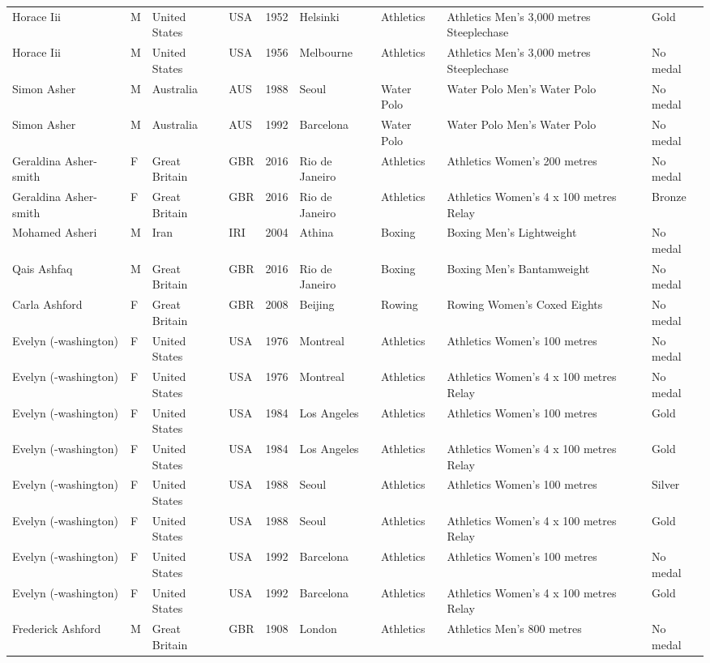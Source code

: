 \documentclass{article}%
\begin{document}
\begin{longtable}{l l l l l l l l l}
Horace Iii&M&United States&USA&1952&Helsinki&Athletics&Athletics Men's 3,000 metres Steeplechase&Gold\\%
Horace Iii&M&United States&USA&1956&Melbourne&Athletics&Athletics Men's 3,000 metres Steeplechase&No medal\\%
Simon Asher&M&Australia&AUS&1988&Seoul&Water Polo&Water Polo Men's Water Polo&No medal\\%
Simon Asher&M&Australia&AUS&1992&Barcelona&Water Polo&Water Polo Men's Water Polo&No medal\\%
Geraldina Asher{-}smith&F&Great Britain&GBR&2016&Rio de Janeiro&Athletics&Athletics Women's 200 metres&No medal\\%
Geraldina Asher{-}smith&F&Great Britain&GBR&2016&Rio de Janeiro&Athletics&Athletics Women's 4 x 100 metres Relay&Bronze\\%
Mohamed Asheri&M&Iran&IRI&2004&Athina&Boxing&Boxing Men's Lightweight&No medal\\%
Qais Ashfaq&M&Great Britain&GBR&2016&Rio de Janeiro&Boxing&Boxing Men's Bantamweight&No medal\\%
Carla Ashford&F&Great Britain&GBR&2008&Beijing&Rowing&Rowing Women's Coxed Eights&No medal\\%
Evelyn ({-}washington)&F&United States&USA&1976&Montreal&Athletics&Athletics Women's 100 metres&No medal\\%
Evelyn ({-}washington)&F&United States&USA&1976&Montreal&Athletics&Athletics Women's 4 x 100 metres Relay&No medal\\%
Evelyn ({-}washington)&F&United States&USA&1984&Los Angeles&Athletics&Athletics Women's 100 metres&Gold\\%
Evelyn ({-}washington)&F&United States&USA&1984&Los Angeles&Athletics&Athletics Women's 4 x 100 metres Relay&Gold\\%
Evelyn ({-}washington)&F&United States&USA&1988&Seoul&Athletics&Athletics Women's 100 metres&Silver\\%
Evelyn ({-}washington)&F&United States&USA&1988&Seoul&Athletics&Athletics Women's 4 x 100 metres Relay&Gold\\%
Evelyn ({-}washington)&F&United States&USA&1992&Barcelona&Athletics&Athletics Women's 100 metres&No medal\\%
Evelyn ({-}washington)&F&United States&USA&1992&Barcelona&Athletics&Athletics Women's 4 x 100 metres Relay&Gold\\%
Frederick Ashford&M&Great Britain&GBR&1908&London&Athletics&Athletics Men's 800 metres&No medal\\%

\end{longtable}
\end{document}
